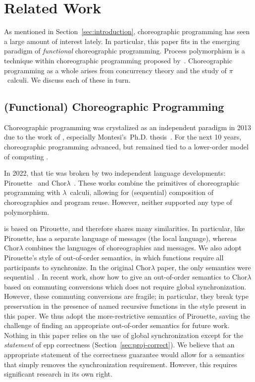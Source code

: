 \section{Related Work}
\label{sec:related-work}

As mentioned in Section~\ref{sec:introduction}, choreographic programming has seen a large amount of interest lately.
In particular, this paper fits in the emerging paradigm of \emph{functional} choreographic programming.
Process polymorphism is a technique within choreographic programming proposed by~\citet{GraversenHM24}.
Choreographic programming as a whole arises from concurrency theory and the study of $\pi$~calculi.
We discuss each of these in turn.

\subsection{(Functional) Choreographic Programming}
\label{sec:choreo-prog}

Choreographic programming was crystalized as an independent paradigm in 2013 due to the work of \citet{CarboneM13}, especially Montesi's~Ph.D. thesis~\citep{Montesi13}.
For the next 10 years, choreographic programming advanced, but remained tied to a lower-order model of computing \cite[see e.g.,][]{CarboneMS14,Cruz-FilipeMP18,Cruz-FilipeM17,LaneseMZ13,Cruz-FilipeM17c}.

In 2022, that tie was broken by two independent language developments: Pirouette~\cite{HirschG22} and Chor$\lambda$~\cite{CruzFilipeGLMP21}.
These works combine the primitives of choreographic programming with $\lambda$~calculi, allowing for (sequential) composition of choreographies and program reuse.
However, neither supported any type of polymorphism.

\languagename is based on Pirouette, and therefore shares many similarities.
In particular, like Pirouette, \languagename has a separate language of messages (the local language), whereas Chor$\lambda$ combines the languages of choreographies and messages.
We also adopt Pirouette's style of out-of-order semantics, in which functions require all participants to synchronize.
In the original Chor$\lambda$ paper, the only semantics were sequential~\cite{CruzFilipeGLMP21}.
In recent work, \citet{CruzFilipeGLMP23} show how to give an out-of-order semantics to Chor$\lambda$ based on commuting conversions which does not require global synchronization.
However, these commuting conversions are fragile; in particular, they break type preservation in the presence of named recursive functions in the style present in this paper.
We thus adopt the more-restrictive semantics of Pirouette, saving the challenge of finding an appropriate out-of-order semantics for future work.
Nothing in this paper relies on the use of global synchronization except for the \emph{statement} of epp correctness (Section~\ref{sec:proj-correct}).
We believe that an appropriate statement of the correctness guarantee would allow for a semantics that simply removes the synchronization requirement.
However, this requires significant research in its own right.

